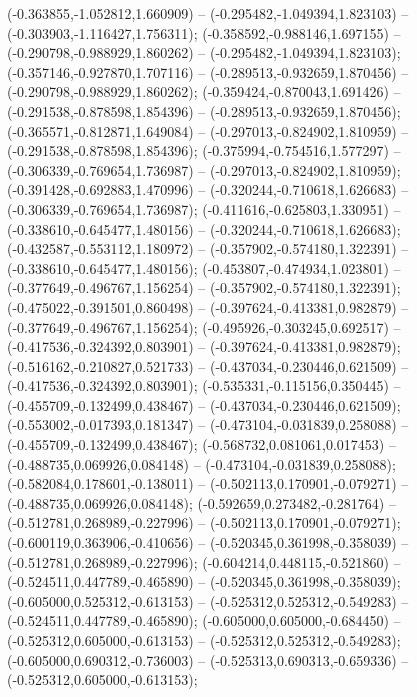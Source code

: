  (-0.363855,-1.052812,1.660909) -- (-0.295482,-1.049394,1.823103) -- (-0.303903,-1.116427,1.756311);
 (-0.358592,-0.988146,1.697155) -- (-0.290798,-0.988929,1.860262) -- (-0.295482,-1.049394,1.823103);
 (-0.357146,-0.927870,1.707116) -- (-0.289513,-0.932659,1.870456) -- (-0.290798,-0.988929,1.860262);
 (-0.359424,-0.870043,1.691426) -- (-0.291538,-0.878598,1.854396) -- (-0.289513,-0.932659,1.870456);
 (-0.365571,-0.812871,1.649084) -- (-0.297013,-0.824902,1.810959) -- (-0.291538,-0.878598,1.854396);
 (-0.375994,-0.754516,1.577297) -- (-0.306339,-0.769654,1.736987) -- (-0.297013,-0.824902,1.810959);
 (-0.391428,-0.692883,1.470996) -- (-0.320244,-0.710618,1.626683) -- (-0.306339,-0.769654,1.736987);
 (-0.411616,-0.625803,1.330951) -- (-0.338610,-0.645477,1.480156) -- (-0.320244,-0.710618,1.626683);
 (-0.432587,-0.553112,1.180972) -- (-0.357902,-0.574180,1.322391) -- (-0.338610,-0.645477,1.480156);
 (-0.453807,-0.474934,1.023801) -- (-0.377649,-0.496767,1.156254) -- (-0.357902,-0.574180,1.322391);
 (-0.475022,-0.391501,0.860498) -- (-0.397624,-0.413381,0.982879) -- (-0.377649,-0.496767,1.156254);
 (-0.495926,-0.303245,0.692517) -- (-0.417536,-0.324392,0.803901) -- (-0.397624,-0.413381,0.982879);
 (-0.516162,-0.210827,0.521733) -- (-0.437034,-0.230446,0.621509) -- (-0.417536,-0.324392,0.803901);
 (-0.535331,-0.115156,0.350445) -- (-0.455709,-0.132499,0.438467) -- (-0.437034,-0.230446,0.621509);
 (-0.553002,-0.017393,0.181347) -- (-0.473104,-0.031839,0.258088) -- (-0.455709,-0.132499,0.438467);
 (-0.568732,0.081061,0.017453) -- (-0.488735,0.069926,0.084148) -- (-0.473104,-0.031839,0.258088);
 (-0.582084,0.178601,-0.138011) -- (-0.502113,0.170901,-0.079271) -- (-0.488735,0.069926,0.084148);
 (-0.592659,0.273482,-0.281764) -- (-0.512781,0.268989,-0.227996) -- (-0.502113,0.170901,-0.079271);
 (-0.600119,0.363906,-0.410656) -- (-0.520345,0.361998,-0.358039) -- (-0.512781,0.268989,-0.227996);
 (-0.604214,0.448115,-0.521860) -- (-0.524511,0.447789,-0.465890) -- (-0.520345,0.361998,-0.358039);
 (-0.605000,0.525312,-0.613153) -- (-0.525312,0.525312,-0.549283) -- (-0.524511,0.447789,-0.465890);
 (-0.605000,0.605000,-0.684450) -- (-0.525312,0.605000,-0.613153) -- (-0.525312,0.525312,-0.549283);
 (-0.605000,0.690312,-0.736003) -- (-0.525313,0.690313,-0.659336) -- (-0.525312,0.605000,-0.613153);
